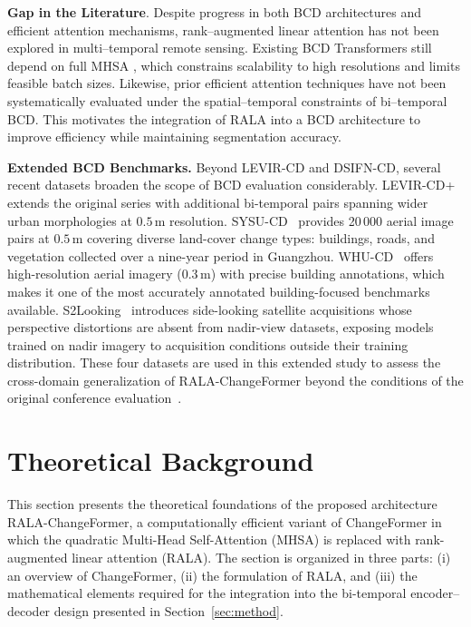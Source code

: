 \documentclass[runningheads]{llncs}
\newcommand{\journal}[1]{{\color{orange}#1}}
\begin{document}
\noindent \textbf{Gap in the Literature}.
Despite progress in both BCD architectures and efficient attention mechanisms,
rank–augmented linear attention has not been explored in multi–temporal remote
sensing. Existing BCD Transformers still depend on full MHSA
\cite{Vaswani2017Attention}, which constrains scalability to high resolutions
and limits feasible batch sizes. Likewise, prior efficient attention techniques
have not been systematically evaluated under the spatial–temporal constraints of
bi–temporal BCD. This motivates the integration of RALA into a BCD architecture
to improve efficiency while maintaining segmentation accuracy.

\journal{%
\noindent \textbf{Extended BCD Benchmarks.}
Beyond LEVIR-CD and DSIFN-CD, several recent datasets broaden the scope of BCD
evaluation considerably.
LEVIR-CD+ \cite{Zheng2020LEVIR} extends the original series with additional
bi-temporal pairs spanning wider urban morphologies at $0.5\,\mathrm{m}$
resolution.
SYSU-CD~\cite{ShiSYSU2022} provides 20\,000 aerial image pairs at
$0.5\,\mathrm{m}$ covering diverse land-cover change types: buildings, roads,
and vegetation collected over a nine-year period in Guangzhou.
WHU-CD~\cite{Ji2019WHU} offers high-resolution aerial imagery
($0.3\,\mathrm{m}$) with precise building annotations, which makes it one of
the most accurately annotated building-focused benchmarks available.
S2Looking~\cite{ShenS2Looking2021} introduces side-looking satellite
acquisitions whose perspective distortions are absent from nadir-view
datasets, exposing models trained on nadir imagery to acquisition conditions
outside their training distribution.
These four datasets are used in this extended study to assess
the cross-domain generalization of RALA-ChangeFormer beyond the conditions of
the original conference evaluation~\cite{acuna2026efficient}.%
}

\section{Theoretical Background}
\label{sec:theoretical}

\journal{This section presents the theoretical foundations of the proposed architecture
RALA-ChangeFormer, a computationally efficient variant of ChangeFormer in
which the quadratic Multi-Head Self-Attention (MHSA) is replaced with
rank-augmented linear attention (RALA). The section is organized in three
parts: (i) an overview of ChangeFormer, (ii) the formulation of RALA, and
(iii) the mathematical elements required for the integration into the
bi-temporal encoder–decoder design presented in Section~\ref{sec:method}.}
\end{document}
